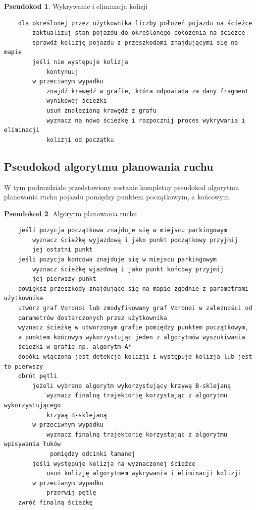 \documentclass[a4paper,11pt,twoside]{report}
\theoremstyle{definition}
\newtheorem{pseudokod}{Pseudokod}[subsection]
\begin{document}
\newpage

\begin{pseudokod}
Wykrywanie i eliminacja kolizji
\begin{verbatim}
    dla określonej przez użytkownika liczby położeń pojazdu na ścieżce
        zaktualizuj stan pojazdu do określonego położenia na ścieżce
        sprawdź kolizję pojazdu z przeszkodami znajdującymi się na mapie
        jeśli nie występuje kolizja
            kontynuuj
        w przeciwnym wypadku
            znajdź krawędź w grafie, która odpowiada za dany fragment 
            wynikowej ścieżki
            usuń znalezioną krawędź z grafu
            wyznacz na nowo ścieżkę i rozpocznij proces wykrywania i eliminacji 
            kolizji od początku
\end{verbatim}
\end{pseudokod}

\subsection{Pseudokod algorytmu planowania ruchu}

W tym podrozdziale przedstawiony zostanie kompletny pseudokod algorytmu planowania ruchu pojazdu pomiędzy punktem początkowym, a końcowym.

\begin{pseudokod}
Algorytm planowania ruchu
\begin{verbatim}
    jeśli pozycja początkowa znajduje się w miejscu parkingowym
        wyznacz ścieżkę wyjazdową i jako punkt początkowy przyjmij 
        jej ostatni punkt
    jeśli pozycja końcowa znajduje się w miejscu parkingowym
        wyznacz ścieżkę wjazdową i jako punkt końcowy przyjmij 
        jej pierwszy punkt
    powiększ przeszkody znajdujące się na mapie zgodnie z parametrami użytkownika
    utwórz graf Voronoi lub zmodyfikowany graf Voronoi w zależności od 
    parametrów dostarczonych przez użytkownika
    wyznacz ścieżkę w utworzonym grafie pomiędzy punktem początkowym, 
    a punktem końcowym wykorzystując jeden z algorytmów wyszukiwania 
    ścieżki w grafie np. algorytm A*
    dopóki włączona jest detekcja kolizji i występuje kolizja lub jest to pierwszy 
    obrót pętli
        jeżeli wybrano algorytm wykorzystujący krzywą B-sklejaną
            wyznacz finalną trajektorię korzystając z algorytmu wykorzystującego 
            krzywą B-sklejaną
        w przeciwnym wypadku
            wyznacz finalną trajektorię korzystając z algorytmu wpisywania łuków
             pomiędzy odcinki łamanej
        jeśli występuje kolizja na wyznaczonej ścieżce
            usuń kolizję algorytmem wykrywania i eliminacji kolizji
        w przeciwnym wypadku
            przerwij pętlę
    zwróć finalną ścieżkę
\end{verbatim}
\end{pseudokod}
\end{document}
